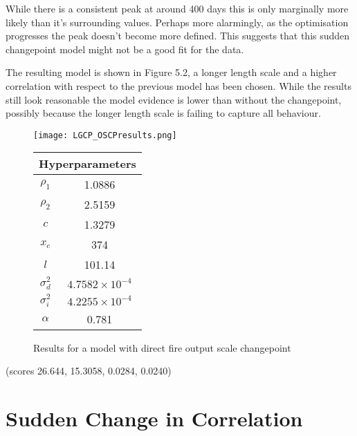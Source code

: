 \documentclass[a4paper,11pt]{report}
\begin{document}
While there is a consistent peak at around 400 days this is only marginally more likely than it's surrounding values. Perhaps more alarmingly, as the optimisation progresses the peak doesn't become more defined. This suggests that this sudden changepoint model might not be a good fit for the data.

The resulting model is shown in Figure 5.2, a longer length scale and a higher correlation with respect to the previous model has been chosen. While the results still look reasonable the model evidence is lower than without the changepoint, possibly because the longer length scale is failing to capture all behaviour. 

  \begin{figure}[!ht]
    \centering
    \texttt{[image: LGCP\_OSCPresults.png]}
    \qquad
    \doublespacing
    \begin{tabular}[b]{cc}
    \multicolumn{2}{c}{\textbf{Hyperparameters}}                                            \\ \hline
      \(\rho_1\)                    & 1.0886                \\                       
\(\rho_2\)                     & 2.5159                           \\            
\(c\)                               & 1.3279                                      \\ 
\(x_c\)                        & 374                                         \\ 
\(l\)                               & 101.14                                      \\  
\(\sigma_d^2\) & \(4.7582 \times 10^{-4}\) \\ 
\(\sigma_i^2\) & \(4.2255 \times 10^{-4}\) \\ 
\(\alpha\)                      & 0.781              \\                      
    \end{tabular}
    \captionsetup{labelformat=andtable}
    \caption{Results for a model with direct fire output scale changepoint}
  \end{figure}
(scores 26.644, 15.3058, 0.0284, 0.0240)


\section{Sudden Change in Correlation}
\end{document}
